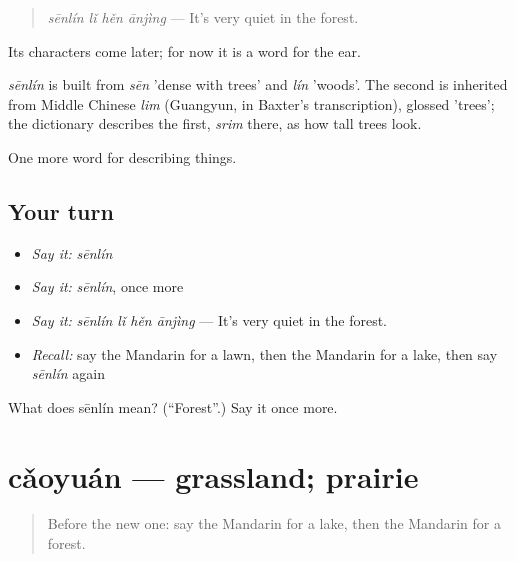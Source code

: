 \begin{quote}
\emph{sēnlín lǐ hěn ānjìng} — It's very quiet in the forest.
\end{quote}

Its characters come later; for now it is a word for the ear.

\begin{cousinweb}
\emph{sēnlín} is built from \emph{sēn} 'dense with trees' and \emph{lín} 'woods'. The second is inherited from Middle Chinese \emph{lim} (Guangyun, in Baxter's transcription), glossed 'trees'; the dictionary describes the first, \emph{srim} there, as how tall trees look.
\end{cousinweb}

\begin{grammarlens}[title={What you've built}]
One more word for describing things.
\end{grammarlens}

\subsection*{Your turn}
\begin{itemize}
\raggedright
  \item \emph{Say it:} \emph{sēnlín}
  \item \emph{Say it:} \emph{sēnlín}, once more
  \item \emph{Say it:} \emph{sēnlín lǐ hěn ānjìng} — It's very quiet in the forest.
  \item \emph{Recall:} say the Mandarin for a lawn, then the Mandarin for a lake, then say \emph{sēnlín} again
\end{itemize}

\begin{tcolorbox}[breakable,colback=teal!4,colframe=teal!35!black,title={Before you move on}]
What does sēnlín mean? (\textquotedblleft{}Forest\textquotedblright{}.) Say it once more.
\end{tcolorbox}
\section[cǎoyuán]{cǎoyuán — grassland; prairie}

\label{lesson:ZH-C226-caoyuan}



\begin{quote}
Before the new one: say the Mandarin for a lake, then the Mandarin for a forest.
\end{quote}

